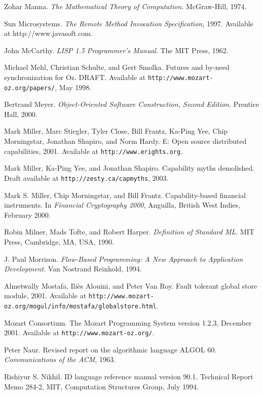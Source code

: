 \begin{thebibliography}{213}
Zohar Manna. \emph{The Mathematical Theory of Computation}. McGraw-Hill, 1974.

Sun Microsystems. \emph{The Remote Method Invocation Specification}, 1997. Available at http://www.javasoft.com.

John McCarthy. \emph{LISP 1.5 Programmer’s Manual}. The MIT Press, 1962.

Michael Mehl, Christian Schulte, and Gert Smolka. Futures and by-need synchronization for Oz. DRAFT. Available at \verb"http://www.mozart-oz.org/papers/", May 1998.

Bertrand Meyer. \emph{Object-Oriented Software Construction, Second Edition}. Prentice Hall, 2000.

Mark Miller, Marc Stiegler, Tyler Close, Bill Frantz, Ka-Ping Yee, Chip Morningstar, Jonathan Shapiro, and Norm Hardy. E: Open source distributed capabilities, 2001. Available at \verb"http://www.erights.org".

Mark Miller, Ka-Ping Yee, and Jonathan Shapiro. Capability myths demolished. Draft available at \verb"http://zesty.ca/capmyths", 2003.

Mark S. Miller, Chip Morningstar, and Bill Frantz. Capability-based financial instruments. In \emph{Financial Cryptography 2000}, Anguilla, British West Indies, February 2000.

Robin Milner, Mads Tofte, and Robert Harper. \emph{Definition of Standard ML}. MIT Press, Cambridge, MA, USA, 1990.

J. Paul Morrison. \emph{Flow-Based Programming: A New Approach to Application Development}. Van Nostrand Reinhold, 1994.

Almetwally Mostafa, Ili\`es Alouini, and Peter Van Roy. Fault tolerant global store module, 2001. Available at \verb"http://www.mozart-oz.org/mogul/info/mostafa/globalstore.html".

Mozart Consortium. The Mozart Programming System version 1.2.3, December 2001. Available at \verb"http://www.mozart-oz.org/".

Peter Naur. Revised report on the algorithmic language ALGOL 60. \emph{Communications of the ACM}, 1963.

Rishiyur S. Nikhil. ID language reference manual version 90.1. Technical Report Memo 284-2, MIT, Computation Structures Group, July 1994.


\end{thebibliography}
